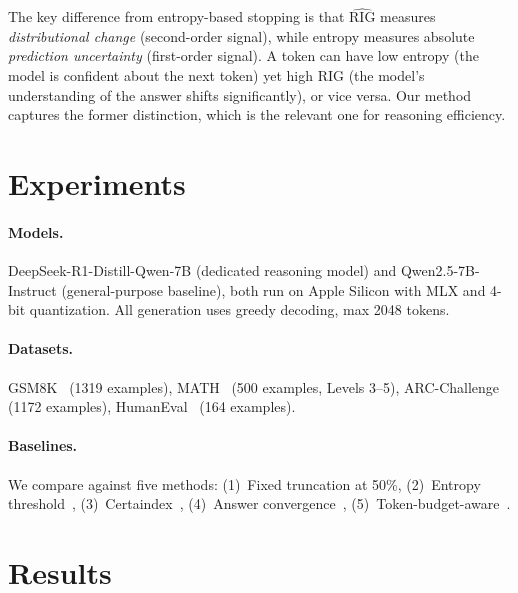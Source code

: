 \documentclass{article}
\newcommand{\RIG}{\mathrm{RIG}}
\begin{document}
The key difference from entropy-based stopping is that $\widehat{\RIG}$ measures \emph{distributional change} (second-order signal), while entropy measures absolute \emph{prediction uncertainty} (first-order signal). A token can have low entropy (the model is confident about the next token) yet high RIG (the model's understanding of the answer shifts significantly), or vice versa. Our method captures the former distinction, which is the relevant one for reasoning efficiency.


\section{Experiments}
\label{sec:experiments}

\paragraph{Models.} DeepSeek-R1-Distill-Qwen-7B (dedicated reasoning model) and Qwen2.5-7B-Instruct (general-purpose baseline), both run on Apple Silicon with MLX and 4-bit quantization. All generation uses greedy decoding, max 2048 tokens.

\paragraph{Datasets.} GSM8K~\citep{gsm8k} (1319 examples), MATH~\citep{math} (500 examples, Levels 3--5), ARC-Challenge~\citep{clark2018arc} (1172 examples), HumanEval~\citep{chen2021humaneval} (164 examples).

\paragraph{Baselines.} We compare against five methods: (1)~Fixed truncation at 50\%, (2)~Entropy threshold~\citep{quamar2025logitentropy}, (3)~Certaindex~\citep{fu2024certaindex}, (4)~Answer convergence~\citep{liu2025answerconvergence}, (5)~Token-budget-aware~\citep{han2025tokenbudget}.


\section{Results}
\label{sec:results}
\end{document}

